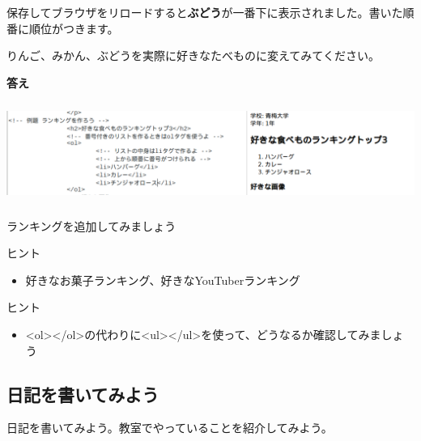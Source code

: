 \documentclass[a4paper,12pt]{jarticle}
\begin{document}
\bigskip


保存してブラウザをリロードすると\textbf{ぶどう}が一番下に表示されました。書いた順番に順位がつきます。

りんご、みかん、ぶどうを実際に好きなたべものに変えてみてください。


\bigskip
\clearpage
\textbf{答え}


\bigskip



\includegraphics[width=15.905cm,height=3.3cm]{textbook-img184.png}


\bigskip


\bigskip


\bigskip


\theQuestion\label{Q:hasAnswer04-6}

ランキングを追加してみましょう

ヒント

\begin{itemize}
  \item
        好きなお菓子ランキング、好きなYouTuberランキング
\end{itemize}


\bigskip

\bigskip

\theQuestion\label{Q:hasAnswer04-7}

ヒント

\begin{itemize}
  \item
        {\textless}ol{\textgreater}{\textless}/ol{\textgreater}の代わりに{\textless}ul{\textgreater}{\textless}/ul{\textgreater}を使って、どうなるか確認してみましょう
\end{itemize}



\bigskip

\clearpage
{}
\subsection{\theExercise 日記を書いてみよう}
日記を書いてみよう。教室でやっていることを紹介してみよう。
\end{document}
